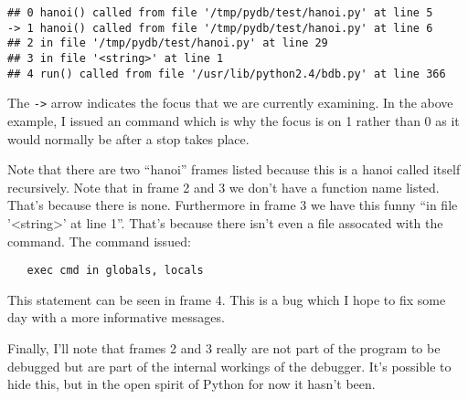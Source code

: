 \begin{verbatim}
## 0 hanoi() called from file '/tmp/pydb/test/hanoi.py' at line 5
-> 1 hanoi() called from file '/tmp/pydb/test/hanoi.py' at line 6
## 2 in file '/tmp/pydb/test/hanoi.py' at line 29
## 3 in file '<string>' at line 1
## 4 run() called from file '/usr/lib/python2.4/bdb.py' at line 366
\end{verbatim}

The {\tt->} arrow indicates the focus that we are currently
examining. In the above example, I issued an  command which
is why the focus is on 1 rather than 0 as it would normally be after a
stop takes place. 

Note that there are two ``hanoi'' frames listed because this is a
hanoi called itself recursively. Note that in frame 2 and 3 we don't
have a function name listed. That's because there is none. Furthermore
in frame 3 we have this funny ``in file '<string>' at line 1''. That's
because there isn't even a file assocated with the command. The
command issued:

\begin{verbatim}
   exec cmd in globals, locals
\end{verbatim}

This statement can be seen in frame 4. This is a bug which I hope to
fix some day with a more informative messages.

Finally, I'll note that frames 2 and 3 really are not part of the
program to be debugged but are part of the internal workings of the
debugger. It's possible to hide this, but in the open spirit of Python
for now it hasn't been.

